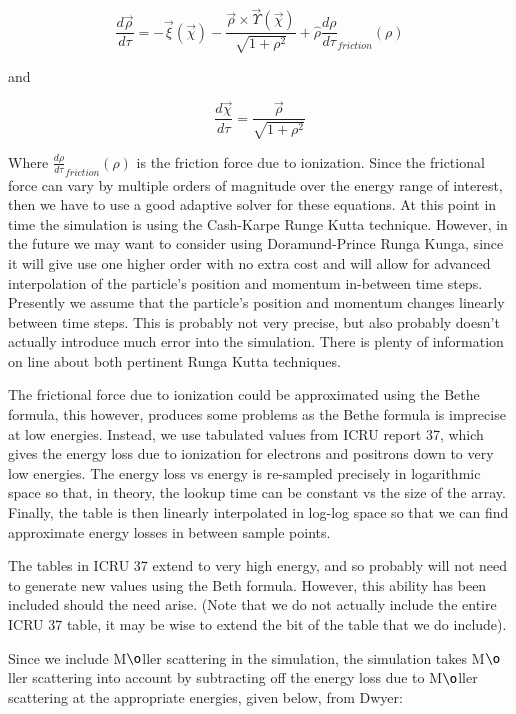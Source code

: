 \documentclass[]{article}
\begin{document}
\begin{equation}
\frac{d \vec{\rho}}{ d \tau} = -\vec{\xi}(\vec{\chi}) -\frac{\vec{\rho} \times \vec{\Upsilon}(\vec{\chi}) }{\sqrt{ 1 + \rho^2 }} + \hat{\rho} \frac{d \rho}{d \tau}_{friction}(\rho)
\end{equation}

and 

\begin{equation}
\frac{d \vec{\chi}}{d \tau} = \frac{\vec{\rho}}{\sqrt{1+\rho^2}}
\end{equation}

Where $\frac{d \rho}{d \tau}_{friction}(\rho)$ is the friction force due to ionization. Since the frictional force can vary by multiple orders of magnitude over the energy range of interest, then we have to use a good adaptive solver for these equations. At this point in time the simulation is using the Cash-Karpe Runge Kutta technique. However, in the future we may want to consider using Doramund-Prince Runga Kunga, since it will give use one higher order with no extra cost and will allow for advanced interpolation of the particle's position and momentum in-between time steps. Presently we assume that the particle's position and momentum changes linearly between time steps. This is probably not very precise, but also probably doesn't actually introduce much error into the simulation. There is plenty of information on line about both pertinent Runga Kutta techniques.

The frictional force due to ionization could be approximated using the Bethe formula, this however, produces some problems as the Bethe formula is imprecise at low energies. Instead, we use tabulated values from ICRU report 37, which gives the energy loss due to ionization for electrons and positrons down to very low energies. The energy loss vs energy is re-sampled precisely in logarithmic space so that, in theory, the lookup time can be constant vs the size of the array. Finally, the table is then linearly interpolated in log-log space so that we can find approximate energy losses in between sample points. 

The tables in ICRU 37 extend to very high energy, and so probably will not need to generate new values using the Beth formula. However, this ability has been included should the need arise. (Note that we do not actually include the entire ICRU 37 table, it may be wise to extend the bit of the table that we do include).

Since we include M$\o$ller scattering in the simulation, the simulation takes M$\o$ller scattering into account by subtracting off the energy loss due to M$\o$ller scattering at the appropriate energies, given below, from Dwyer:
\end{document}
